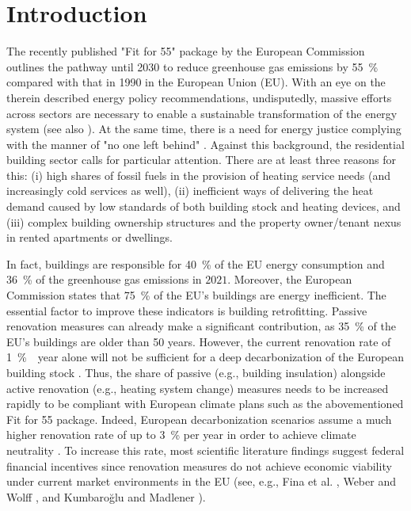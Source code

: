 \section{Introduction}
The recently published "Fit for 55" package \cite{european_commission_european_2019} by the European Commission outlines the pathway until 2030 to reduce greenhouse gas emissions by \SI{55}{\%} compared with that in 1990 in the European Union (EU). With an eye on the therein described energy policy recommendations, undisputedly, massive efforts across sectors are necessary to enable a sustainable transformation of the energy system (see also \cite{korkmaz2020comparison}). At the same time, there is a need for energy justice complying with the manner of "no one left behind" \cite{sovacool2019decarbonization}. Against this background, the residential building sector calls for particular attention. There are at least three reasons for this: (i) high shares of fossil fuels in the provision of heating service needs (and increasingly cold services as well), (ii) inefficient ways of delivering the heat demand caused by low standards of both building stock and heating devices, and (iii) complex building ownership structures and the property owner/tenant nexus in rented apartments or dwellings.\vspace{0.5cm}

In fact, buildings are responsible for \SI{40}{\%} of the EU energy consumption and \SI{36}{\%} of the greenhouse gas emissions in $2021$. Moreover, the European Commission states that \SI{75}{\%} of the EU's buildings are energy inefficient. The essential factor to improve these indicators is building retrofitting. Passive renovation measures can already make a significant contribution, as \SI{35}{\%} of the EU's buildings are older than \SI{50}{} years. However, the current renovation rate of \SI{1}{\% \per year} alone will not be sufficient for a deep decarbonization of the European building stock \cite{eurocombuildings2021}. Thus, the share of passive (e.g., building insulation) alongside active renovation (e.g., heating system change) measures needs to be increased rapidly to be compliant with European climate plans such as the abovementioned Fit for 55 package. Indeed, European decarbonization scenarios assume a much higher renovation rate of up to \SI{3}{\%} per year in order to achieve climate neutrality \cite{korkmaz2020comparison}. To increase this rate, most scientific literature findings suggest federal financial incentives since renovation measures do not achieve economic viability under current market environments in the EU (see, e.g., Fina et al. \cite{fina2019profitability}, Weber and Wolff \cite{weber2018energy}, and Kumbaroğlu and Madlener \cite{kumbarouglu2012evaluation}).\vspace{0.5cm}

